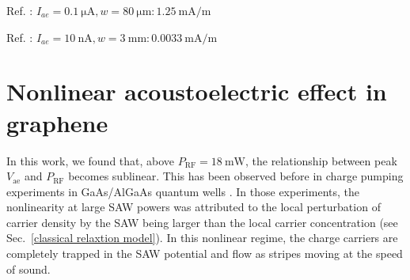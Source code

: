 \documentclass[double,12pt,1in,seploa]{beavtex}
\let\Oldsection\section
\renewcommand{\section}{\FloatBarrier\Oldsection}
\begin{document}
\noindent
Ref. \cite{tang_ultra-low_2017}: $I_{ae} = \SI{0.1}{\micro \ampere}, w = \SI{80}{\micro\meter}: \SI{1.25}{\milli \ampere/\meter}$

\noindent
Ref. \cite{bandhu_controlling_2016}: $I_{ae} = \SI{10}{\nano \ampere}, w = \SI{3}{\milli\meter}: \SI{0.0033}{\milli \ampere/\meter}$


\section{Nonlinear acoustoelectric effect in graphene} \label{nonlinear acoustoelectric effect}

In this work, we found that, above $P_{\mathrm{RF}} = \SI{18}{\milli\watt}$, the relationship between peak $V_{\mathrm{ae}}$ and $P_{\mathrm{RF}}$ becomes sublinear. This has been observed before in charge pumping experiments in GaAs/AlGaAs quantum wells \cite{rotter_charge_1999,rotter_nonlinear_1999}. In those experiments, the nonlinearity at large SAW powers was attributed to the local perturbation of carrier density by the SAW being larger than the local carrier concentration (see Sec.\ \ref{classical relaxtion model}). In this nonlinear regime, the charge carriers are completely trapped in the SAW potential and flow as stripes moving at the speed of sound.
\end{document}
